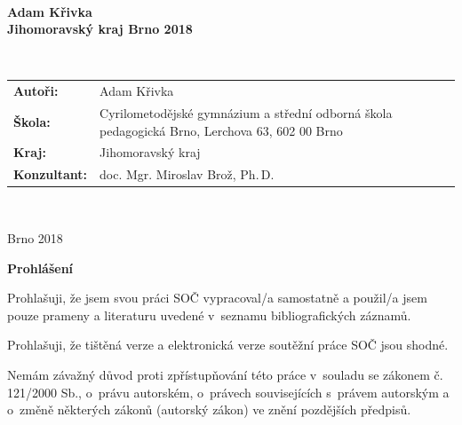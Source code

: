 \documentclass[A4paper, 12pt, oneside]{book}
\begin{document}
\pagestyle{empty}
\begin{center}
	{\fontsize{18pt}{22pt}\selectfont {}} \\
	{\fontsize{14pt}{17pt}\selectfont {}}
\end{center}
\vfill
\begin{center}
	{\fontsize{20pt}{26pt}\selectfont {}}
\end{center}
\vfill
{\large \bfseries Adam Křivka \\
	Jihomoravský kraj \hfill Brno 2018}
\newpage

\begin{center}
	{\fontsize{18pt}{22pt}\selectfont {}} \\
	{\fontsize{14pt}{17pt}\selectfont {}}
\end{center}
\vfill
\begin{center}
	{\fontsize{20pt}{26pt}\selectfont {}}

	 {\fontsize{20pt}{26pt}\selectfont {}}
\end{center}
\vfill
\begin{tabularx}{\textwidth}{lX}
	{\bfseries Autoři:} & Adam Křivka \\
	{\bfseries Škola:} & Cyrilometodějské gymnázium a střední odborná škola pedagogická Brno, Lerchova 63, 602 00 Brno \\
	{\bfseries Kraj:} & Jihomoravský kraj \\
	{\bfseries Konzultant:} & doc. Mgr. Miroslav Brož, Ph.\,D.
\end{tabularx}

\

\noindent Brno 2018

\newpage

{\large \bfseries Prohlášení}

Prohlašuji, že jsem svou práci SOČ vypracoval/a samostatně a použil/a jsem pouze prameny a literaturu uvedené v~seznamu bibliografických záznamů.

Prohlašuji, že tištěná verze a elektronická verze soutěžní práce SOČ jsou shodné. 

Nemám závažný důvod proti zpřístupňování této práce v~souladu se zákonem č. 121/2000 Sb., o~právu autorském, o~právech souvisejících s~právem autorským a o~změně některých zákonů (autorský zákon) ve znění pozdějších předpisů. 
\end{document}
